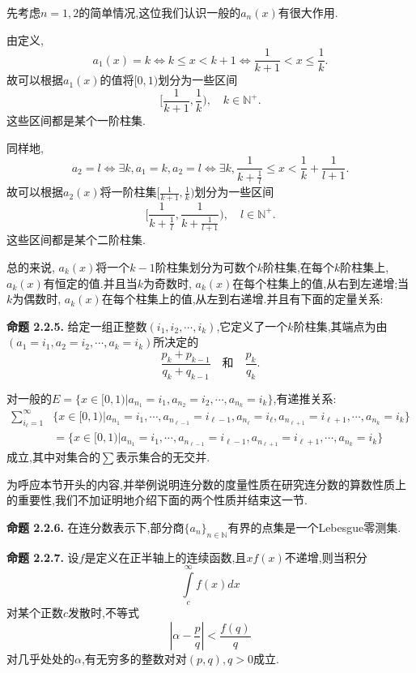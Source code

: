 先考虑$n=1,2$的简单情况,这位我们认识一般的$a_n(x)$有很大作用.\par
由定义,
$$a_1(x)=k\iff k\leqslant x<k+1\iff \frac{1}{k+1}<x\leqslant\frac{1}{k}.$$
故可以根据$a_1(x)$的值将$[0,1)$划分为一些区间
$$[\frac{1}{k+1},\frac{1}{k}),\quad k\in \mathbb{N^{+}}.$$
这些区间都是某个一阶柱集.\par
同样地,
$$a_2=l\iff\exists k,a_1=k,a_2=l\iff\exists k,\dfrac{1}{k+\frac{1}{l}}\leqslant x<\dfrac{1}{k}+\frac{1}{l+1}.$$
故可以根据$a_2(x)$将一阶柱集$[\frac{1}{k+1},\frac{1}{k})$划分为一些区间
$$[\dfrac{1}{k+\frac{1}{l}},\dfrac{1}{k+\frac{1}{l+1}}),\quad l\in \mathbb{N^{+}}.$$
这些区间都是某个二阶柱集.\par
总的来说, $a_{k}(x)$将一个$k-1$阶柱集划分为可数个$k$阶柱集,在每个$k$阶柱集上, $a_{k}(x)$有恒定的值.并且当$k$为奇数时, $a_k(x)$在每个柱集上的值,从右到左递增;当$k$为偶数时, $a_k(x)$在每个柱集上的值,从左到右递增.并且有下面的定量关系:\par
\textbf{命题 2.2.5.  }\textsuperscript{\cite{Khinchin}}
给定一组正整数$(i_1,i_2,\cdots,i_k)$,它定义了一个$k$阶柱集,其端点为由$(a_1=i_1,a_2=i_2,\cdots,a_k=i_k)$所决定的
$$\frac{p_k+p_{k-1}}{q_k+q_{k-1}}\quad\text{和}\quad\frac{p_k}{q_k}.$$
\par
对一般的$E=\{x\in [0,1)|a_{n_1}=i_1,a_{n_2}=i_2,\cdots,a_{n_k}=i_k\}$,有递推关系:
\begin{align*}
\sum_{i_{\ell}=1}^{\infty}&\{x\in [0,1)|a_{n_1}=i_1,\cdots,a_{n_{\ell-1}}=i_{\ell-1},a_{n_{\ell}}=i_{\ell},a_{n_{\ell+1}}=i_{\ell+1},\cdots,a_{n_k}=i_k\}\\
&=\{x\in [0,1)|a_{n_1}=i_1,\cdots,a_{n_{\ell-1}}=i_{\ell-1},a_{n_{\ell+1}}=i_{\ell+1},\cdots,a_{n_k}=i_k\}
\end{align*}
成立,其中对集合的$\sum$表示集合的无交并.\par
为呼应本节开头的内容,并举例说明连分数的度量性质在研究连分数的算数性质上的重要性,我们不加证明地介绍下面的两个性质并结束这一节.\par
\textbf{命题 2.2.6.  }\textsuperscript{\cite{Khinchin}}
在连分数表示下,部分商$\{a_n\}_{n\in \mathbb{N}}$有界的点集是一个Lebesgue零测集.
\par
\par
\textbf{命题 2.2.7.  }\textsuperscript{\cite{Khinchin}}
设$f$是定义在正半轴上的连续函数,且$xf(x)$不递增,则当积分
$$
\int\limits_{c}^{\infty}f\left(x\right)dx
$$
对某个正数$c$发散时,不等式
$$\left|\alpha-\frac{p}{q}\right|<\frac{f(q)}{q}$$
对几乎处处的$\alpha$,有无穷多的整数对对$(p,q),q>0$成立.
\par

